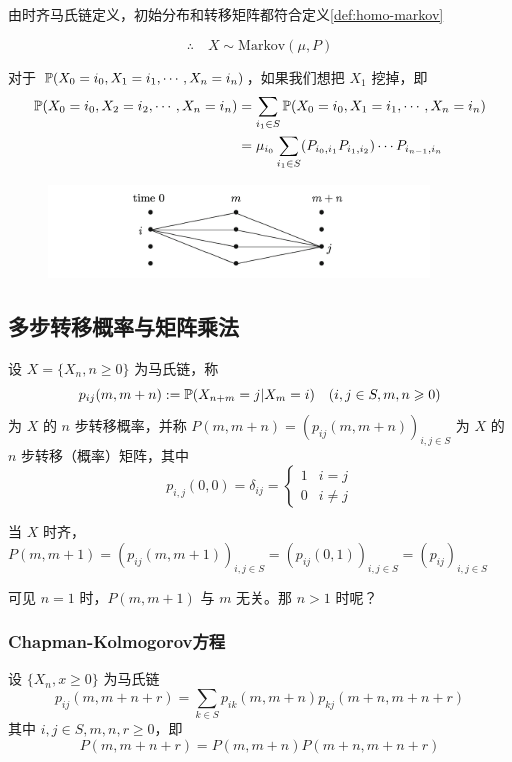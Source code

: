 由时齐马氏链定义，初始分布和转移矩阵都符合定义\ref{def:homo-markov}

\[
\therefore \quad X\sim \text{Markov}(\mu,P)
\]

对于 $\mathbb{P}(X_0=i_0,X_1=i_1,\cdots,X_{n}=i_{n})$，如果我们想把 $X_1$ 挖掉，即
\[
\begin{aligned}
    \mathbb{P}(X_0=i_0,X_2=i_2,\cdots,X_{n}=i_{n})&=\sum_{i_1\in S}\mathbb{P}(X_0=i_0,X_1=i_1,\cdots,X_{n}=i_{n})\\
    &=\mu_{i_0}\sum_{i_1\in S}(P_{i_0,i_1}P_{i_1,i_2})\cdots P_{i_{n-1},i_n}
\end{aligned}
\]

\begin{figure}[H]
    \centering
    \includegraphics[width=0.9\textwidth]{figures/split_steps.png}
\end{figure}

\subsection{多步转移概率与矩阵乘法}

\begin{definition}
    设 $X=\{X_n,n\geq 0\}$ 为马氏链，称
    \[
    p_{ij}(m,m+n):=\mathbb{P}(X_{n+m}=j|X_m=i)\quad (i,j\in S, m,n\geqslant 0)
    \]
    为 $X$ 的 $n$ 步转移概率，并称 $P(m,m+n)=(p_{ij}(m,m+n))_{i,j\in S}$ 为 $X$ 的 $n$ 步转移（概率）矩阵，其中
    \[
    p_{i,j}(0,0)=\delta_{ij}=\begin{cases}
        1 & i=j\\
        0 & i\neq j
    \end{cases}
    \]
\end{definition}

当 $X$ 时齐，$P(m,m+1)=(p_{ij}(m,m+1))_{i,j\in S}=(p_{ij}(0,1))_{i,j\in S}=(p_{ij})_{i,j\in S}$

可见 $n=1$ 时，$P(m,m+1)$ 与 $m$ 无关。那 $n>1$ 时呢？

\subsubsection{Chapman-Kolmogorov方程}

\begin{theorem}[C-K方程]\label{thm:CK}
    设 $\{X_n,x\geq 0\}$ 为马氏链
    \[
    p_{ij}(m,m+n+r)=\sum_{k\in S}p_{ik}(m,m+n)p_{kj}(m+n,m+n+r)
    \]
    其中 $i,j\in S,m,n,r\geq 0$，即
    \[
    P(m,m+n+r)=P(m,m+n)P(m+n,m+n+r)
    \]
\end{theorem}

